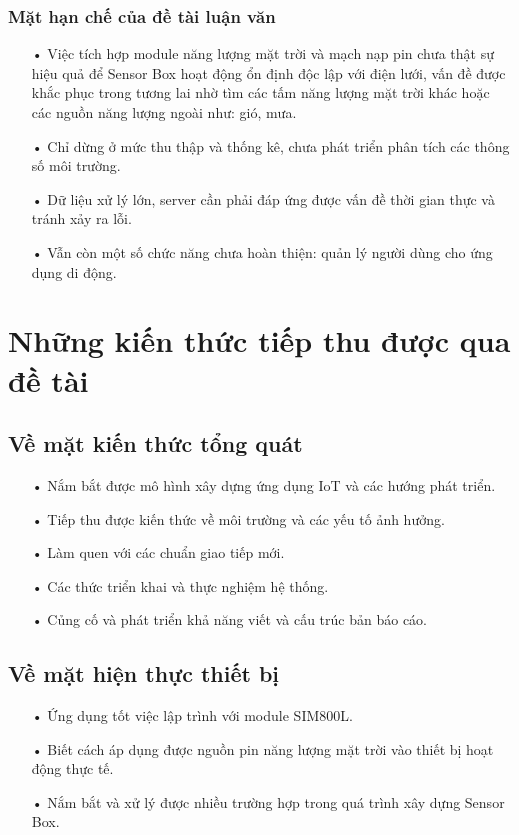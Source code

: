 \subsubsection*{Mặt hạn chế của đề tài luận văn}
\begin{itemize}
\item[•] Việc tích hợp module năng lượng mặt trời và mạch nạp pin chưa thật sự hiệu quả để Sensor Box hoạt động ổn định độc lập với điện lưới, vấn đề được khắc phục trong tương lai nhờ tìm các tấm năng lượng mặt trời khác hoặc các nguồn năng lượng ngoài như: gió, mưa.
\item[•] Chỉ dừng ở mức thu thập và thống kê, chưa phát triển phân tích các thông số môi trường.
\item[•] Dữ liệu xử lý lớn, server cần phải đáp ứng được vấn đề thời gian thực và tránh xảy ra lỗi.
\item[•] Vẫn còn một số chức năng chưa hoàn thiện: quản lý người dùng cho ứng dụng di động.
\end{itemize}




\section{Những kiến thức tiếp thu được qua đề tài}
\subsection{Về mặt kiến thức tổng quát}
\begin{itemize}
	\item[•] Nắm bắt được mô hình xây dựng ứng dụng IoT và các hướng phát triển.
	\item[•] Tiếp thu được kiến thức về môi trường và các yếu tố ảnh hưởng.
	\item[•] Làm quen với các chuẩn giao tiếp mới.
	\item[•] Các thức triển khai và thực nghiệm hệ thống.
	\item[•] Củng cố và phát triển khả năng viết và cấu trúc bản báo cáo. 
\end{itemize}
\subsection{Về mặt hiện thực thiết bị}
\begin{itemize}
	\item[•] Ứng dụng tốt việc lập trình với module SIM800L.
	\item[•] Biết cách áp dụng được nguồn pin năng lượng mặt trời vào thiết bị hoạt động thực tế.
	\item[•] Nắm bắt và xử lý được nhiều trường hợp trong quá trình xây dựng Sensor Box.
\end{itemize}
